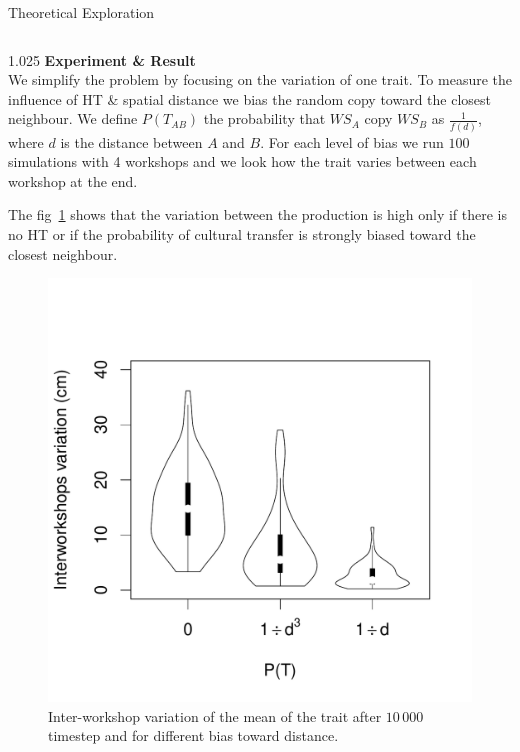 \documentclass[final]{beamer}
\newlength{\onecolwid}
\newlength{\twocolwid}
\begin{document}
\begin{frame}[t]
\begin{columns}[t]
\begin{column}{\twocolwid}
\begin{block}{Theoretical Exploration}
\begin{columns}[t,totalwidth=\twocolwid]
\begin{column}{1.025\onecolwid} %
{\textbf{Experiment \& Result}}\\
\justify
We simplify the problem by focusing on the variation of one trait. To measure the influence of HT \& spatial distance we bias the random copy toward the closest neighbour. We define $P(T_{AB})$ the probability that $WS_A$ copy $WS_B$ as $\frac{1}{f(d)}$, where $d$ is the distance between $A$ and $B$.
For each level of bias we run $100$ simulations with 4 workshops and we look how the trait varies between each workshop at the end.

The fig~\ref{fig:resmod} shows that the variation between the production is high only if there is no HT or if the probability of cultural transfer is strongly biased toward the closest neighbour.
\vspace{-1cm}

    \begin{figure}[h!]
    \centering
%	    
	\includegraphics[width=0.5\linewidth]{images/interworkshopvar.pdf}
\singlespace
\vspace{-.8cm}
\caption{Inter-workshop variation of the mean of the trait after $10\,000$ timestep and for different bias toward distance.}%
	
	\label{fig:resmod}
    \end{figure}
\vspace{-1cm}




\end{column}
\end{columns}
\end{block}
\end{column}
\end{columns}
\end{frame}
\end{document}
